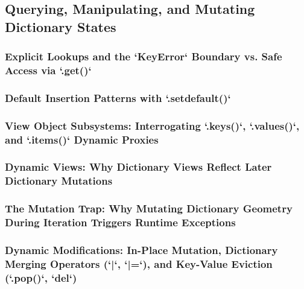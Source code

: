 \subsection{Querying, Manipulating, and Mutating Dictionary States}
\subsubsection{Explicit Lookups and the `KeyError` Boundary vs. Safe Access via `.get()`}
\subsubsection{Default Insertion Patterns with `.setdefault()`}
\subsubsection{View Object Subsystems: Interrogating `.keys()`, `.values()`, and `.items()` Dynamic Proxies}
\subsubsection{Dynamic Views: Why Dictionary Views Reflect Later Dictionary Mutations}
\subsubsection{The Mutation Trap: Why Mutating Dictionary Geometry During Iteration Triggers Runtime Exceptions}
\subsubsection{Dynamic Modifications: In-Place Mutation, Dictionary Merging Operators (`|`, `|=`), and Key-Value Eviction (`.pop()`, `del`)}

